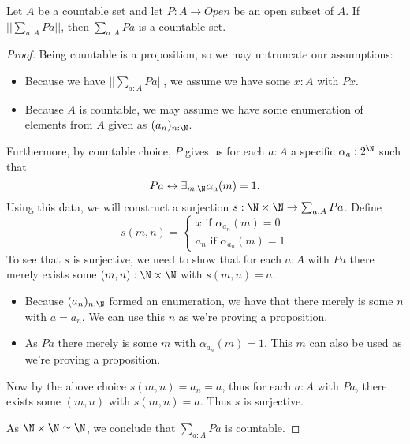 \begin{lemma}
  Let $A$ be a countable set and let $P:A \to Open$
  be an open subset of $A$. 
  If $||\sum_{a:A} P a||$, then $\sum_{a:A} P a$ is a countable set. 
\end{lemma}
\begin{proof}
  Being countable is a proposition, so we may untruncate our assumptions:
  \begin{itemize}
    \item 
      Because we have $||\sum_{a:A} P a||$, we assume we have  some $x:A$ with $P x$. 
    \item 
      Because $A$ is countable, we may assume we have some 
      enumeration of elements from $A$ given as $(a_n)_{n:\N}$.
  \end{itemize}
  Furthermore, by countable choice, $P$ gives us 
  for each $a:A$ a specific $\alpha_a:2^\N$ 
  such that 
  \begin{equation}
    P a \leftrightarrow \exists_{m:\N} \alpha_a(m) = 1.
  \end{equation}
  Using this data, we will 
  construct a surjection $s:\N \times \N \to \sum_{a:A} P a$. 
  Define 
  \begin{equation}
    s(m,n) = 
    \begin{cases}
      x \text{ if } \alpha_{a_n}(m) = 0 \\
      a_n \text{ if } \alpha_{a_n}(m) = 1
    \end{cases}
  \end{equation}
  To see that $s$ is surjective, we need to show that for each $a:A$ with $P a$ there 
  merely exists some $(m,n):\N \times \N$ 
  with $s(m,n) = a$. 
  \begin{itemize}
    \item 
  Because $(a_n)_{n:\N}$ formed an enumeration, we have that 
  there merely is some $n$ with $a = a_n$. 
  We can use this $n$ as we're proving a proposition. 
    \item 
  As $P a$ there merely is some $m$ with $\alpha_{a_n}(m) = 1$. 
  This $m$ can also be used as we're proving a proposition. 
  \end{itemize}
  Now by the above choice $s(m,n) = a_n = a$, 
  thus for each $a:A$ with $P a$, there exists some $(m,n)$ with 
  $s(m,n) = a$. Thus $s$ is surjective. 

  As $\N \times \N \simeq \N$, we conclude that 
  $\sum_{a:A} P a$ is countable. 
\end{proof}
